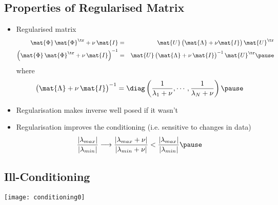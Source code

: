\begin{slide}
\section[-1.5]{Properties of Regularised Matrix}

\begin{PauseHighLight}

\begin{itemize}\squeeze
\item Regularised matrix
  \begin{eqnarray*}
    \mat{\Phi}\, \mat{\Phi}^\tr + \nu\, \mat{I} &=& \mat{U} \left( \strut
      \mat{\Lambda} +  \nu \mat{I} \right) \mat{U}^\tr  \\
    \left(\mat{\Phi}\, \mat{\Phi}^\tr + \nu\, \mat{I}\right)^{-1} &=&
      \mat{U} \left( \strut \mat{\Lambda} +  \nu\, \mat{I} \right)^{-1}
      \mat{U}^\tr\pause
  \end{eqnarray*}
  where
  \begin{displaymath}
    \left( \strut \mat{\Lambda} +  \nu \, \mat{I} \right)^{-1} =
    \diag\left(\frac{1}{\lambda_1+\nu}, \cdots,
    \frac{1}{\lambda_N+\nu}\right)\pause
  \end{displaymath}
\item Regularisation makes inverse well posed if it wasn't\pause
\item Regularisation improves the conditioning (i.e. sensitive to
  changes in data)
  \begin{displaymath}
    \frac{|\lambda_{max}|}{|\lambda_{min}|}\longrightarrow
    \frac{|\lambda_{max}+\nu|}{|\lambda_{min}+\nu|} <
    \frac{|\lambda_{max}|}{|\lambda_{min}|}\pause
  \end{displaymath}
\end{itemize}


\end{PauseHighLight}
\end{slide}


\begin{slide}
\section[-1.5]{Ill-Conditioning}

\pb\pause
\begin{center}
  \texttt{[image: conditioning0]}
\end{center}

\end{slide}


